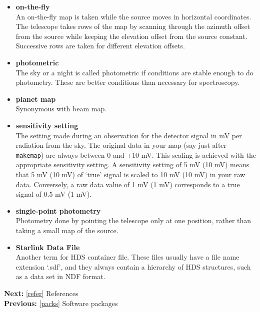 \documentclass[11pt]{article}
\newenvironment{latexonly}{}{}
\begin{document}
\begin{itemize}
\item{\bf \label{glossonthefly}on-the-fly}\\
   An on-the-fly map is taken while
   the source moves in horizontal coordinates. The telescope takes rows
   of the map by scanning through the azimuth offset from the source
   while keeping the elevation offset from the source constant.
   Successive rows are taken for different elevation offsets.

\item{\bf \label{glossphotometric}photometric}\\
   The sky or a night is called
   photometric if conditions are stable enough to do photometry. These
   are better conditions than necessary for spectroscopy.

\item{\bf \label{glossplanetmap}planet map}\\
   Synonymous with beam map.

\item{\bf \label{glosssensset}sensitivity setting}\\
   The setting made during
   an observation for the detector signal in mV per radiation from the
   sky. The original data in your map (say just after {\tt makemap}) are
   always between 0 and +10 mV. This scaling is achieved with the
   appropriate sensitivity setting. A sensitivity setting of 5 mV (10
   mV) means that 5 mV (10 mV) of `true' signal is scaled to 10 mV (10
   mV) in your raw data. Conversely, a raw data value of 1 mV (1 mV)
   corresponds to a true signal of 0.5 mV (1 mV).

\item{\bf \label{glosssinglepoint}single-point photometry}\\
   Photometry done
   by pointing the telescope only at one position, rather than taking a
   small map of the source.

\item{\bf \label{glosssdf}Starlink Data File}\\
   Another term for HDS container
   file. These files usually have a file name extension `.sdf', and they
   always contain a hierarchy of HDS structures, such as a data set in
   NDF format.

\end{itemize}

\begin{latexonly}
{\bf Next:} \ref{refer} References\\
{\bf Previous:} \ref{packs} Software packages\\
\end{latexonly}
\end{document}
